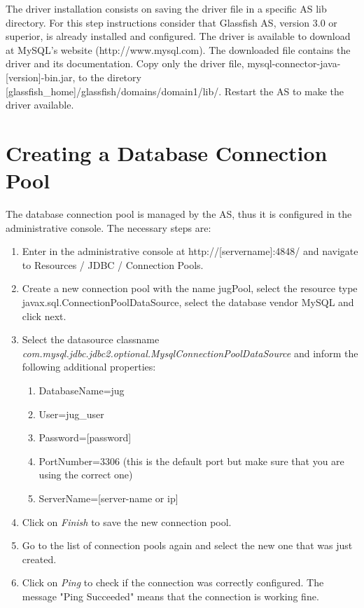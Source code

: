 \documentclass[envcountsame,envcountchap]{svmono}
\begin{document}
The driver installation consists on saving the driver file in a specific AS lib directory. For this step instructions consider that Glassfish AS, version 3.0 or superior, is already installed and configured. The driver is available to download at MySQL's website (http://www.mysql.com). The downloaded file contains the driver and its documentation. Copy only the driver file, mysql-connector-java-[version]-bin.jar, to the diretory [glassfish\_home]/glassfish/domains/domain1/lib/. Restart the AS to make the driver available.

\section{Creating a Database Connection Pool}
\label{sec:creating-database-connection-pool}

The database connection pool is managed by the AS, thus it is configured in the administrative console. The necessary steps are:

\begin{enumerate}
\item  Enter in the administrative console at http://[servername]:4848/ and navigate to Resources / JDBC / Connection Pools.
\item Create a new connection pool with the name jugPool, select the resource type javax.sql.ConnectionPoolDataSource, select the database vendor MySQL and click next.
\item Select the datasource classname \\ \textit{com.mysql.jdbc.jdbc2.optional.MysqlConnectionPoolDataSource} and inform the following additional properties:
   \begin{enumerate}
   \item DatabaseName=jug
   \item User=jug\_user
   \item Password=[password]
   \item PortNumber=3306 (this is the default port but make sure
   that you are using the correct one)
   \item ServerName=[server-name or ip]
   \end{enumerate}
\item Click on \textit{Finish} to save the new connection pool.
\item Go to the list of connection pools again and select the new one that was just created.
\item Click on \textit{Ping} to check if the connection was correctly configured. The message "Ping Succeeded" means that the connection is working fine.
\end{enumerate}
\end{document}
